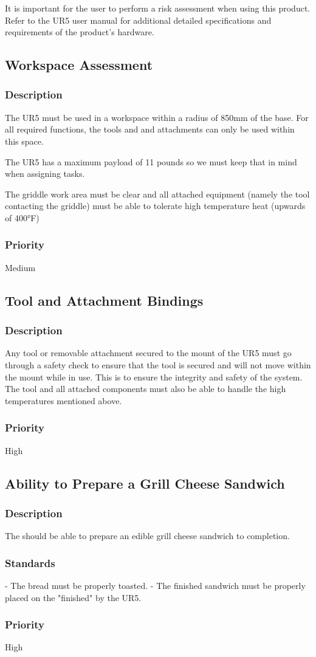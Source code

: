 It is important for the user to perform a risk assessment when using this product. Refer to the UR5 user manual for additional detailed specifications and requirements of the product's hardware. 

\subsection{Workspace Assessment}
\subsubsection{Description}
The UR5 must be used in a workspace within a radius of 850mm of the base. For all required functions, the tools and and attachments can only be used within this space. 

The UR5 has a maximum payload of 11 pounds so we must keep that in mind when assigning tasks.

The griddle work area must be clear and all attached equipment (namely the tool contacting the griddle) must be able to tolerate high temperature heat (upwards of 400°F)
\subsubsection{Priority}
Medium

\subsection{Tool and Attachment Bindings}
\subsubsection{Description}
Any tool or removable attachment secured to the mount of the UR5 must go through a safety check to ensure that the tool is secured and will not move within the mount while in use. This is to ensure the integrity and safety of the system. The tool and all attached components must also be able to handle the high temperatures mentioned above.
\subsubsection{Priority}
High


\subsection{Ability to Prepare a Grill Cheese Sandwich}
\subsubsection{Description}
The \productname{} should be able to prepare an edible grill cheese sandwich to completion. 
\subsubsection{Standards}
- The bread must be properly toasted. 
- The finished sandwich must be properly placed on the "finished" by the UR5.   
\subsubsection{Priority}
High
